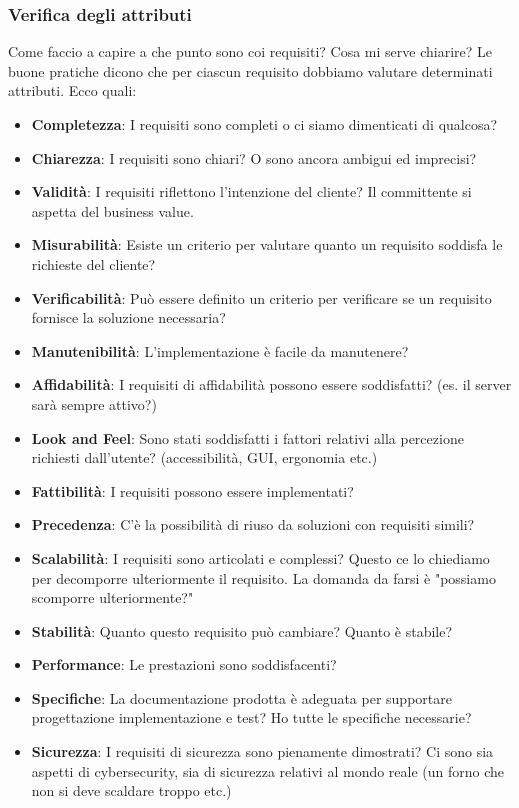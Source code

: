 \subsubsection{Verifica degli attributi}
Come faccio a capire a che punto sono coi requisiti? Cosa mi serve chiarire? Le buone pratiche dicono che per ciascun requisito dobbiamo valutare determinati attributi. Ecco quali:
\begin{itemize}
	\item \textbf{Completezza}: I requisiti sono completi o ci siamo dimenticati di qualcosa?
	\item \textbf{Chiarezza}: I requisiti sono chiari? O sono ancora ambigui ed imprecisi?
	\item \textbf{Validità}: I requisiti riflettono l'intenzione del cliente? Il committente si aspetta del business value.
	\item \textbf{Misurabilità}: Esiste un criterio per valutare quanto un requisito soddisfa le richieste del cliente?
	\item \textbf{Verificabilità}: Può essere definito un criterio per verificare se un requisito fornisce la soluzione necessaria?
	\item \textbf{Manutenibilità}: L'implementazione è facile da manutenere?
	\item \textbf{Affidabilità}: I requisiti di affidabilità possono essere soddisfatti? (es. il server sarà sempre attivo?)
	\item \textbf{Look and Feel}: Sono stati soddisfatti i fattori relativi alla percezione richiesti dall'utente? (accessibilità, GUI, ergonomia etc.)
	\item \textbf{Fattibilità}: I requisiti possono essere implementati?
	\item \textbf{Precedenza}: C'è la possibilità di riuso da soluzioni con requisiti simili?
	\item \textbf{Scalabilità}: I requisiti sono articolati e complessi? Questo ce lo chiediamo per decomporre ulteriormente il requisito. La domanda da farsi è "possiamo scomporre ulteriormente?"
	\item \textbf{Stabilità}: Quanto questo requisito può cambiare? Quanto è stabile?
	\item \textbf{Performance}: Le prestazioni sono soddisfacenti?
	\item \textbf{Specifiche}: La documentazione prodotta è adeguata per supportare progettazione implementazione e test? Ho tutte le specifiche necessarie?
	\item \textbf{Sicurezza}: I requisiti di sicurezza sono pienamente dimostrati? Ci sono sia aspetti di cybersecurity, sia di sicurezza relativi al mondo reale (un forno che non si deve scaldare troppo etc.)
\end{itemize}
